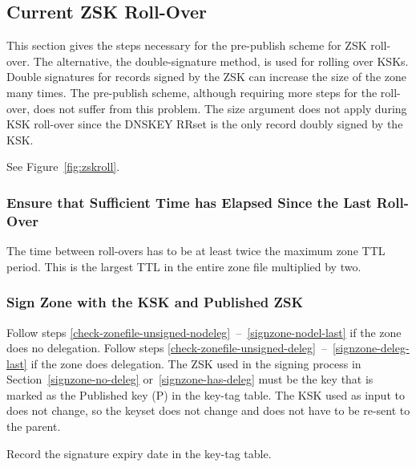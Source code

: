 
\clearpage
\subsection{Current ZSK Roll-Over}
\label{roll-curzsk}

This section gives the steps necessary for the pre-publish scheme for ZSK
roll-over.  The alternative, the double-signature method, is used for rolling
over KSKs.  Double signatures for records signed by the ZSK can increase the
size of the zone many times.  The pre-publish scheme, although requiring more
steps for the roll-over, does not suffer from this problem. The size argument
does not apply during KSK roll-over since the DNSKEY RRset is the only record
doubly signed by the KSK.

See Figure~\ref{fig:zskroll}.


\subsubsection{Ensure that Sufficient Time has Elapsed Since the Last Roll-Over}

The time between roll-overs has to be at least twice the maximum zone TTL
period.  This is the largest TTL in the entire zone file multiplied by two.


\subsubsection{Sign Zone with the KSK and Published ZSK}

Follow steps \ref{check-zonefile-unsigned-nodeleg}~--~\ref{signzone-nodel-last}
if the zone does no delegation.  Follow steps
\ref{check-zonefile-unsigned-deleg}~--~\ref{signzone-deleg-last} if the
zone does delegation.  The ZSK used in the signing process in
Section~\ref{signzone-no-deleg} or~\ref{signzone-has-deleg} must be the key
that is marked as the Published key (P) in the key-tag table. The KSK used
as input to  does not change, so the keyset does not
change and does not have to be re-sent to the parent.

Record the signature expiry date in the key-tag table.

